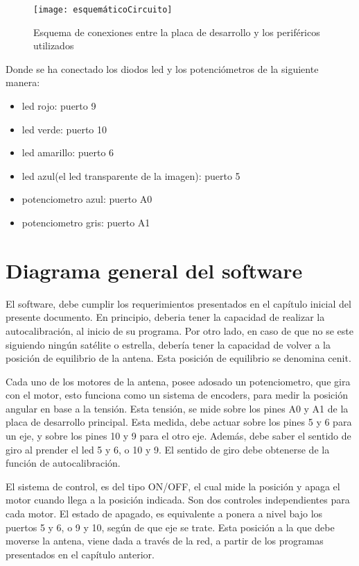 \begin{figure}[p]
	\centering 
	\texttt{[image: esquemáticoCircuito]}
	\caption{Esquema de conexiones entre la placa de desarrollo y los periféricos utilizados} 
	\label{fig:esq_completo} 
\end{figure}

Donde se ha conectado los diodos led y los potenciómetros de la siguiente manera: 
\begin{itemize}
	\label{item:prototipo_leds_pote}
	\item led rojo: puerto 9 
	\item led verde: puerto 10 
	\item led amarillo: puerto 6 
	\item led azul(el led transparente de la imagen): puerto 5 
	\item potenciometro azul: puerto A0 
	\item potenciometro gris: puerto A1 
	
\end{itemize}


\section{Diagrama general del software}

El software, debe cumplir los requerimientos presentados en el capítulo inicial del presente documento. En principio, deberia tener la capacidad de realizar la autocalibración, al inicio de su programa. Por otro lado, en caso  de que no se este siguiendo ningún satélite o estrella, debería tener la capacidad de volver a la posición de equilibrio de la antena. Esta posición de equilibrio se denomina cenit. 

Cada uno de los motores de la antena, posee adosado un potenciometro, que gira con el motor, esto funciona como un sistema de encoders, para medir la posición angular en base a la tensión. Esta tensión, se mide sobre los pines A0 y A1 de la placa de desarrollo principal. Esta medida, debe actuar sobre los pines 5 y 6 para un eje, y sobre los pines 10 y 9 para el otro eje. Además, debe saber el sentido de giro al prender el led 5 y 6, o 10 y 9. El sentido de giro debe obtenerse de la función de autocalibración.  

El sistema de control, es del tipo ON/OFF, el cual mide la posición y apaga el motor cuando llega a la posición indicada. Son dos controles independientes para cada motor. El estado de apagado, es equivalente a ponera a nivel bajo los puertos 5 y 6, o 9 y 10, según  de que eje se trate. Esta posición a la que debe moverse la antena, viene dada a través de la red, a partir de los programas presentados en el capítulo anterior. 


